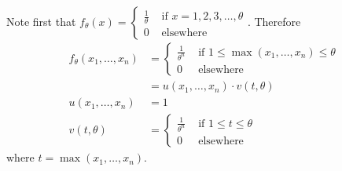 \documentclass[12pt]{article}
\begin{document}
Note first that $f_\theta(x) = \begin{cases} \frac{1}{\theta} &\text{ if } x = 1,2,3,\dots,\theta \\ 0 &\text{ elsewhere } \end{cases} $. Therefore $$ \begin{aligned} f_\theta(x_1,\dots,x_n) &= \begin{cases} \frac{1}{\theta^n} &\text{ if } 1 \leq \max(x_1,\dots,x_n) \leq \theta \\ 0 &\text{ elsewhere} \end{cases} \\ &= u(x_1,\dots,x_n) \cdot v(t,\theta) \\ u(x_1,\dots,x_n) &= 1 \\ v(t,\theta) &= \begin{cases} \frac{1}{\theta^n} &\text{ if } 1 \leq t \leq \theta \\ 0 &\text{ elsewhere} \end{cases} \end{aligned} $$ where $t = \max(x_1,\dots,x_n)$. 
\end{document}
